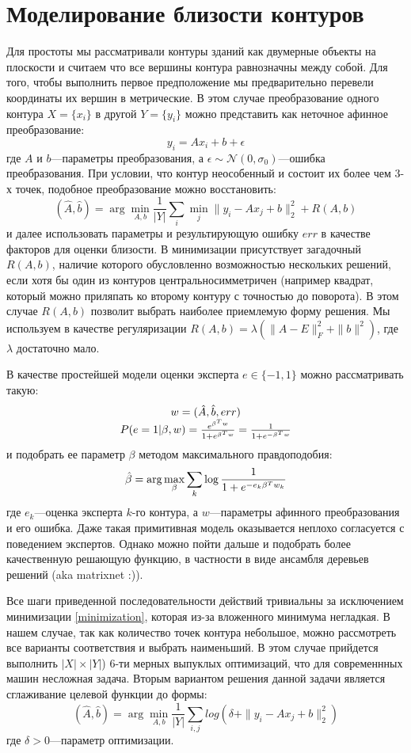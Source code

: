 \documentclass[12pt]{article}
\begin{document}
\section{Моделирование близости контуров}
\label{similarity}
Для простоты мы рассматривали контуры зданий как двумерные объекты на плоскости и считаем что все вершины контура равнозначны между собой. Для того, чтобы выполнить первое предположение мы предварительно перевели координаты их вершин в метрические. В этом случае преобразование одного контура $X = \{x_i\}$ в другой $Y = \{y_i\}$ можно представить как неточное афинное преобразование:
$$
y_i = A x_i + b + \epsilon
$$
где $A$ и $b$---параметры преобразования, а $\epsilon \sim \mathcal{N}(0, \sigma_0)$---ошибка преобразования. При условии, что контур неособенный и состоит их более чем 3-х точек, подобное преобразование можно восстановить:
\begin{equation}
\label{minimization}
(\hat{A},\hat{b})=\arg \min_{A, b} \frac{1}{|Y|}\sum_i \min_j \|y_i - A x_j + b\|^2_2 + R(A, b)
\end{equation}
и далее использовать параметры и результирующую ошибку $err$ в качестве факторов для оценки близости. В минимизации присутствует загадочный $R(A, b)$, наличие которого обусловленно возможностью нескольких решений, если хотя бы один из контуров центральносимметричен (например квадрат, который можно приляпать ко второму контуру с точностью до поворота). В этом случае $R(A,b)$ позволит выбрать наиболее приемлемую форму решения. Мы используем в качестве регуляризации $R(A, b) = \lambda\left(\|A - E\|_F^2 + \|b\|^2\right)$, где $\lambda$ достаточно мало.

В качестве простейшей модели оценки эксперта $e \in \{-1, 1\}$ можно рассматривать такую:
$$\begin{array}{c}
w = (\hat{A}, \hat{b}, err) \\
P(e = 1| \beta, w) = {e^{\beta^T w} \over 1 + e^{\beta^T w}} = {1 \over 1 + e^{-\beta^T w}}
\end{array}$$
и подобрать ее параметр $\beta$ методом максимального правдоподобия:
$$
\hat{\beta} = \arg \max_\beta \sum_k \log{1 \over 1 + e^{-e_k\beta^T w_k}}
$$
где $e_k$---оценка эксперта $k$-го контура, а $w$---параметры афинного преобразования и его ошибка. Даже такая примитивная модель оказывается неплохо согласуется с поведением экспертов. Однако можно пойти дальше и подобрать более качественную решающую функцию, в частности в виде ансамбля деревьев решений (aka matrixnet :)).

Все шаги приведенной последовательности действий тривиальны за исключением минимизации \ref{minimization}, которая из-за вложенного минимума негладкая. В нашем случае, так как количество точек контура небольшое, можно рассмотреть все варианты соответствия и выбрать наименьший. В этом случае прийдется выполнить $|X|\times|Y|$) 6-ти мерных выпуклых оптимизаций, что для современнных машин несложная задача. Вторым вариантом решения данной задачи является сглаживание целевой функции до формы:
$$
(\hat{A},\hat{b})=\arg \min_{A, b} \frac{1}{|Y|}\sum_{i,j} log(\delta + \|y_i - A x_j + b\|^2_2)
$$
где $\delta >0$---параметр оптимизации.
\end{document}
